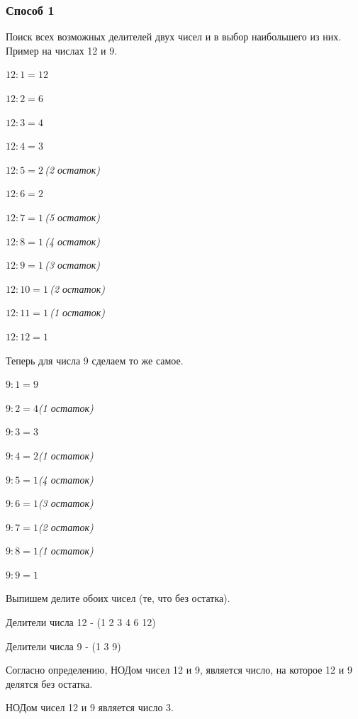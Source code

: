 \documentclass[12pt]{article}
\begin{document}
\subsubsection{Способ 1}
Поиск всех возможных делителей двух чисел и в выбор наибольшего из них. Пример на числах 12 и 9.\par
$12 : 1 = 12$\par
$12 : 2 = 6$\par
$12 : 3 = 4$\par
$12 : 4 = 3$\par
$12 : 5 = 2 \,$\textit{(2 остаток)}\par
$12 : 6 = 2$\par
$12 : 7 = 1 \,$\textit{(5 остаток)}\par
$12 : 8 = 1 \,$\textit{(4 остаток)}\par
$12 : 9 = 1 \,$\textit{(3 остаток)}\par
$12 : 10 = 1 \,$\textit{(2 остаток)}\par
$12 : 11 = 1 \,$\textit{(1 остаток)}\par
$12 : 12 = 1$\par
Теперь для числа 9 сделаем то же самое.\par
$9 : 1 = 9$\par
$9 : 2 = 4$\textit{(1 остаток)}\par
$9 : 3 = 3$\par
$9 : 4 = 2$\textit{(1 остаток)}\par
$9 : 5 = 1$\textit{(4 остаток)}\par
$9 : 6 = 1$\textit{(3 остаток)}\par
$9 : 7 = 1$\textit{(2 остаток)}\par
$9 : 8 = 1$\textit{(1 остаток)}\par
$9 : 9 = 1$\par
Выпишем делите обоих чисел (те, что без остатка).\par
Делители числа 12 - (1 2 3 4 6 12)\par
Делители числа 9 - (1 3 9)\par
Согласно определению, НОДом чисел 12 и 9, является число, на которое 12 и 9 делятся без остатка.\par
НОДом чисел 12 и 9 является число 3.\par
\end{document}
